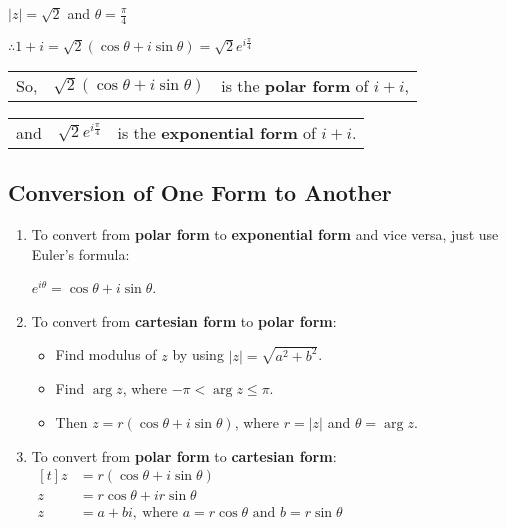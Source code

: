 \documentclass[11pt,a4paper]{book}
\begin{document}
$\left|z\right|=\sqrt{2}$ and ${\displaystyle \theta=\frac{\pi}{4}}$

${\displaystyle \therefore1+i=\sqrt{2}\left(\cos\theta+i\sin\theta\right)=\sqrt{2}e^{i\frac{\pi}{4}}}$
\begin{center}
\begin{tabular}[t]{>{\raggedright}p{0.8cm}>{\raggedright}p{3cm}>{\raggedright}p{6cm}}
So, & $\sqrt{2}\left(\cos\theta+i\sin\theta\right)$ & is the \textbf{polar form} of $i+i$,\tabularnewline
\end{tabular}
\par\end{center}

\begin{center}
\begin{tabular}[t]{>{\raggedright}p{0.8cm}>{\raggedright}p{3cm}>{\raggedright}p{6cm}}
and & $\sqrt{2}e^{i\frac{\pi}{4}}$ & is the \textbf{exponential form} of $i+i$.\tabularnewline
\end{tabular}
\par\end{center}

\subsection{Conversion of One Form to Another}

\begin{enumerate}

\item  To convert from \textbf{polar form} to \textbf{exponential
form} and vice versa, just use Euler's formula:

$e^{i\theta}=\cos\theta+i\sin\theta$.

\item  To convert from \textbf{cartesian form }to \textbf{polar form}:

\begin{itemize}

\item  Find modulus of $z$ by using $\left|z\right|=\sqrt{a^{2}+b^{2}}$.

\item  Find $\arg z$, where $-\pi<\arg z\leq\pi$.

\item  Then $z=r\left(\cos\theta+i\sin\theta\right)$, where $r=\left|z\right|$ and $\theta=\arg z$.

\end{itemize}

\item  To convert from \textbf{polar form} to \textbf{cartesian form}:
$
\begin{aligned}[t]
z & =r\left(\cos\theta+i\sin\theta\right)\\
z & =r\cos\theta+ir\sin\theta\\
z & =a+bi,\:\text{where }a=r\cos\theta\text{ and }b=r\sin\theta
\end{aligned}
$

\end{enumerate}
\end{document}
